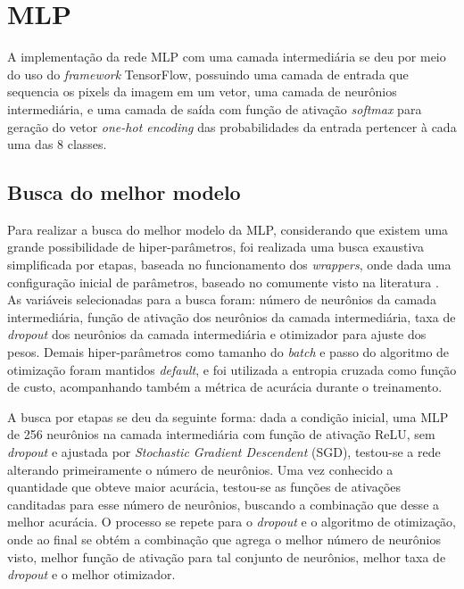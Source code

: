 \clearpage
\section{MLP}

A implementação da rede MLP com uma camada intermediária se deu por meio do uso do \textit{framework} TensorFlow, possuindo uma camada de entrada que sequencia os pixels da imagem em um vetor, uma camada de neurônios intermediária, e uma camada de saída com função de ativação \textit{softmax} para geração do vetor \textit{one-hot encoding} das probabilidades da entrada pertencer à cada uma das 8 classes.

\subsection{Busca do melhor modelo}

Para realizar a busca do melhor modelo da MLP, considerando que existem uma grande possibilidade de hiper-parâmetros, foi realizada uma busca exaustiva simplificada por etapas, baseada no funcionamento dos \textit{wrappers}, onde dada uma configuração inicial de parâmetros, baseado no comumente visto na literatura \cite{geron2019hands}. As variáveis selecionadas para a busca foram: número de neurônios da camada intermediária, função de ativação dos neurônios da camada intermediária, taxa de \textit{dropout} dos neurônios da camada intermediária e otimizador para ajuste dos pesos. Demais hiper-parâmetros como tamanho do \textit{batch} e passo do algoritmo de otimização foram mantidos \textit{default}, e foi utilizada a entropia cruzada como função de custo, acompanhando também a métrica de acurácia durante o treinamento.

A busca por etapas se deu da seguinte forma: dada a condição inicial, uma MLP de 256 neurônios na camada intermediária com função de ativação ReLU, sem \textit{dropout} e ajustada por \textit{Stochastic Gradient Descendent} (SGD), testou-se a rede alterando primeiramente o número de neurônios. Uma vez conhecido a quantidade que obteve maior acurácia, testou-se as funções de ativações canditadas para esse número de neurônios, buscando a combinação que desse a melhor acurácia. O processo se repete para o \textit{dropout} e o algoritmo de otimização, onde ao final se obtém a combinação que agrega o melhor número de neurônios visto, melhor função de ativação para tal conjunto de neurônios, melhor taxa de \textit{dropout} e o melhor otimizador.

